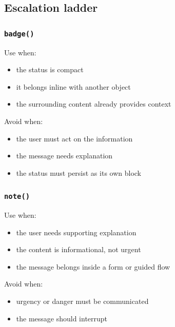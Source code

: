 \subsection{Escalation ladder}\label{record-023-escalation-ladder}

\subsubsection{\texorpdfstring{\texttt{b\allowbreak{}a\allowbreak{}d\allowbreak{}g\allowbreak{}e\allowbreak{}(\allowbreak{})}}{}}\label{record-023-badge}

Use when:

\begin{itemize}
\tightlist
\item
  the status is compact
\item
  it belongs inline with another object
\item
  the surrounding content already provides context
\end{itemize}

Avoid when:

\begin{itemize}
\tightlist
\item
  the user must act on the information
\item
  the message needs explanation
\item
  the status must persist as its own block
\end{itemize}

\subsubsection{\texorpdfstring{\texttt{n\allowbreak{}o\allowbreak{}t\allowbreak{}e\allowbreak{}(\allowbreak{})}}{}}\label{record-023-note}

Use when:

\begin{itemize}
\tightlist
\item
  the user needs supporting explanation
\item
  the content is informational, not urgent
\item
  the message belongs inside a form or guided flow
\end{itemize}

Avoid when:

\begin{itemize}
\tightlist
\item
  urgency or danger must be communicated
\item
  the message should interrupt
\end{itemize}

